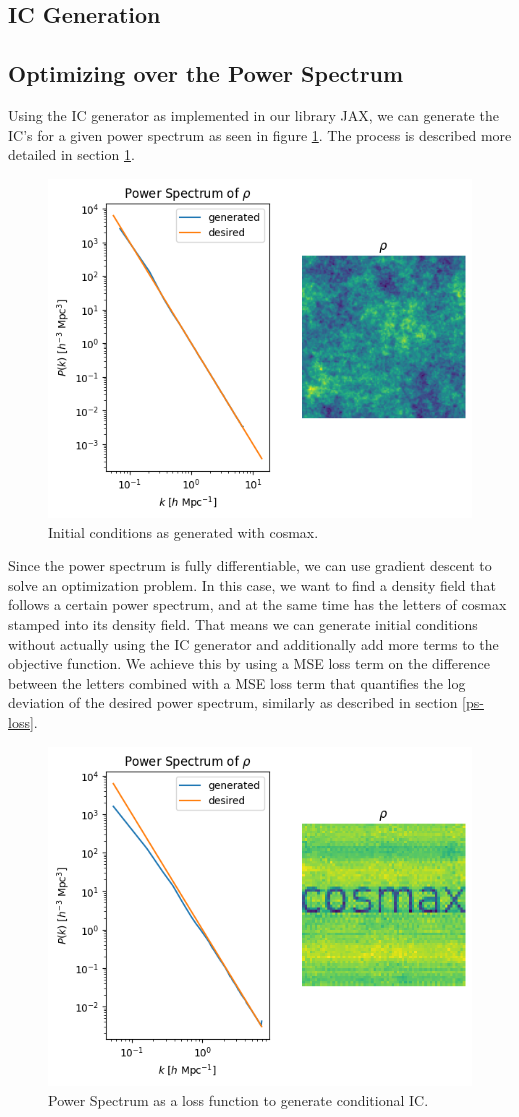 \documentclass{article}
\begin{document}
{\begin{appendices}
\newpage
\section{IC Generation}

\subsection{Optimizing over the Power Spectrum}
\label{optim}

Using the IC generator as implemented in our library JAX, we can generate the IC's for a given power spectrum as seen in figure \ref{fig:cosmax-ic}. The process is described more detailed in section \ref{fig:cosmax-ic}.

\begin{figure}[h]
    \centering
    \includegraphics[width=0.5\linewidth]{img/ic_gen.png}
    \caption{Initial conditions as generated with cosmax.}
    \label{fig:cosmax-ic}
\end{figure}

Since the power spectrum is fully differentiable, we can use gradient descent to solve an optimization problem. In this case, we want to find a density field that follows a certain power spectrum, and at the same time has the letters of cosmax stamped into its density field. That means we can generate initial conditions without actually using the IC generator and additionally add more terms to the objective function. We achieve this by using a MSE loss term on the difference between the letters combined with a MSE loss term that quantifies the log deviation of the desired power spectrum, similarly as described in section \ref{ps-loss}.

\begin{figure}[h]
    \centering
    \includegraphics[width=0.5\linewidth]{img/cond_ic.png}
    \caption{Power Spectrum as a loss function to generate conditional IC.}
    \label{fig:cosmax-cosmax}
\end{figure}


\end{appendices}}
\end{document}
